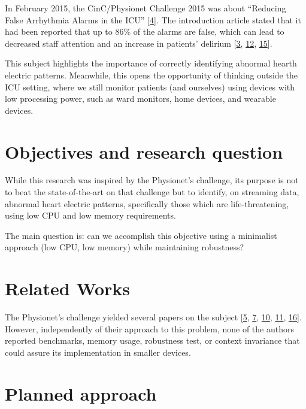 \documentclass[runningheads]{llncs}
\begin{document}
In February 2015, the CinC/Physionet Challenge 2015 was about ``Reducing False Arrhythmia Alarms in
the ICU'' {[}\protect\hyperlink{ref-Clifford2015}{4}{]}. The introduction article stated that it had been reported that up to 86\%
of the alarms are false, which can lead to decreased staff attention and an increase in patients'
delirium {[}\protect\hyperlink{ref-Chambrin2001}{3}, \protect\hyperlink{ref-Lawless1994}{12}, \protect\hyperlink{ref-Parthasarathy2004}{15}{]}.

This subject highlights the importance of correctly identifying abnormal hearth electric patterns.
Meanwhile, this opens the opportunity of thinking outside the ICU setting, where we still monitor
patients (and ourselves) using devices with low processing power, such as ward monitors, home
devices, and wearable devices.

\hypertarget{objectives-and-research-question}{%
\section{Objectives and research question}\label{objectives-and-research-question}}

While this research was inspired by the Physionet's challenge, its purpose is not to beat the
state-of-the-art on that challenge but to identify, on streaming data, abnormal heart electric
patterns, specifically those which are life-threatening, using low CPU and low memory requirements.

The main question is: can we accomplish this objective using a minimalist approach (low CPU, low
memory) while maintaining robustness?

\hypertarget{related-works}{%
\section{Related Works}\label{related-works}}

The Physionet's challenge yielded several papers on the subject
{[}\protect\hyperlink{ref-couto2015}{5}, \protect\hyperlink{ref-fallet2015}{7}, \protect\hyperlink{ref-hoogantink2015}{10}, \protect\hyperlink{ref-kalidas2015}{11}, \protect\hyperlink{ref-plesinger2015}{16}{]}. However, independently of
their approach to this problem, none of the authors reported benchmarks, memory usage, robustness
test, or context invariance that could assure its implementation in smaller devices.

\hypertarget{planned-approach}{%
\section{Planned approach}\label{planned-approach}}
\end{document}
